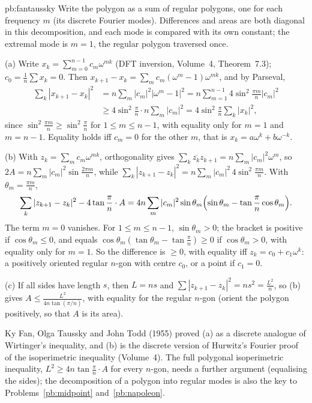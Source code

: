 \begin{solution}{pb:fantaussky}
\idea Write the polygon as a sum of regular polygons, one for each frequency $m$ (its discrete Fourier modes). Differences and areas
are both diagonal in this decomposition, and each mode is compared with its own constant; the extremal mode is $m=1$, the regular
polygon traversed once.

\writeup (a) Write $x_k=\sum_{m=0}^{n-1}c_m\omega^{mk}$ (DFT inversion, Volume~4, Theorem~7.3); $c_0=\frac1n\sum x_k=0$. Then $x_{k+1}-x_k=\sum_mc_m(\omega^m-1)\omega^{mk}$, and by
Parseval,
\[
\begin{aligned}\sum_k|x_{k+1}-x_k|^2&=n\sum_m|c_m|^2|\omega^m-1|^2=n\sum_{m=1}^{n-1}4\sin^2\frac{\pi m}n|c_m|^2\\&\ge4\sin^2\frac\pi n\cdot n\sum_m|c_m|^2=4\sin^2\frac\pi n\sum_k|x_k|^2,\end{aligned}
\]
since $\sin^2\frac{\pi m}n\ge\sin^2\frac\pi n$ for $1\le m\le n-1$, with equality only for $m=1$ and $m=n-1$. Equality holds iff $c_m=0$ for the other $m$, that is
$x_k=a\omega^k+b\omega^{-k}$.

(b) With $z_k=\sum_mc_m\omega^{mk}$, orthogonality gives $\sum_k\overline{z_k}z_{k+1}=n\sum_m|c_m|^2\omega^m$, so $2A=n\sum_m|c_m|^2\sin\frac{2\pi m}n$, while
$\sum_k|z_{k+1}-z_k|^2=n\sum_m|c_m|^2\,4\sin^2\frac{\pi m}n$. With $\theta_m=\frac{\pi m}n$,
\[
\sum_k|z_{k+1}-z_k|^2-4\tan\frac\pi n\cdot A=4n\sum_m|c_m|^2\sin\theta_m\Bigl(\sin\theta_m-\tan\frac\pi n\cos\theta_m\Bigr).
\]
The term $m=0$ vanishes. For $1\le m\le n-1$, $\sin\theta_m>0$; the bracket is positive if $\cos\theta_m\le0$, and equals $\cos\theta_m(\tan\theta_m-\tan\frac\pi n)\ge0$ if
$\cos\theta_m>0$, with equality only for $m=1$. So the difference is $\ge0$, with equality iff $z_k=c_0+c_1\omega^k$: a positively oriented regular $n$-gon
with centre $c_0$, or a point if $c_1=0$.

(c) If all sides have length $s$, then $L=ns$ and $\sum|z_{k+1}-z_k|^2=ns^2=\frac{L^2}n$, so (b) gives $A\le\frac{L^2}{4n\tan(\pi/n)}$, with equality for the regular
$n$-gon (orient the polygon positively, so that $A$ is its area).

\leads Ky Fan, Olga Taussky and John Todd (1955) proved (a) as a discrete analogue of Wirtinger's inequality, and (b) is the discrete
version of Hurwitz's Fourier proof of the isoperimetric inequality (Volume~4). The full polygonal isoperimetric inequality,
$L^2\ge4n\tan\frac\pi n\cdot A$ for every $n$-gon, needs a further argument (equalising the sides); the decomposition of a polygon into regular
modes is also the key to Problems~\ref{pb:midpoint} and~\ref{pb:napoleon}.
\end{solution}

